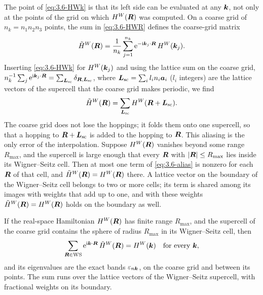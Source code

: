 The point of \cref{eq:3.6-HWk} is that its left side can be evaluated at any $\bm{k}$, not only at the points of the grid on which $H^W(\bm{R})$ was computed. On a coarse grid of $n_k = n_1n_2n_3$ points, the sum in \cref{eq:3.6-HWR} defines the coarse-grid matrix
\begin{equation*}
  \tilde H^W(\bm{R}) = \frac{1}{n_k}\sum_{j=1}^{n_k}\mathrm{e}^{-\mathrm{i}\bm{k}_j\cdot\bm{R}}\,H^W(\bm{k}_j) .
\end{equation*}
Inserting \cref{eq:3.6-HWk} for $H^W(\bm{k}_j)$ and using the lattice sum on the coarse grid, $n_k^{-1}\sum_j\mathrm{e}^{\mathrm{i}\bm{k}_j\cdot\bm{R}} = \sum_{\bm{L}_{\mathrm{sc}}}\delta_{\bm{R},\bm{L}_{\mathrm{sc}}}$, where $\bm{L}_{\mathrm{sc}} = \sum_i l_i n_i\bm{a}_i$ ($l_i$ integers) are the lattice vectors of the supercell that the coarse grid makes periodic, we find
\begin{equation}
  \tilde H^W(\bm{R}) = \sum_{\bm{L}_{\mathrm{sc}}}H^W(\bm{R} + \bm{L}_{\mathrm{sc}}) .
  \label{eq:3.6-alias}
\end{equation}
The coarse grid does not lose the hoppings; it folds them onto one supercell, so that a hopping to $\bm{R} + \bm{L}_{\mathrm{sc}}$ is added to the hopping to $\bm{R}$. This aliasing is the only error of the interpolation. Suppose $H^W(\bm{R})$ vanishes beyond some range $R_{\mathrm{max}}$, and the supercell is large enough that every $\bm{R}$ with $|\bm{R}| \le R_{\mathrm{max}}$ lies inside its Wigner--Seitz cell. Then at most one term of \cref{eq:3.6-alias} is nonzero for each $\bm{R}$ of that cell, and $\tilde H^W(\bm{R}) = H^W(\bm{R})$ there. A lattice vector on the boundary of the Wigner--Seitz cell belongs to two or more cells; its term is shared among its images with weights that add up to one, and with these weights $\tilde H^W(\bm{R}) = H^W(\bm{R})$ holds on the boundary as well.
\begin{keyresult}
If the real-space Hamiltonian $H^W(\bm{R})$ has finite range $R_{\mathrm{max}}$, and the supercell of the coarse grid contains the sphere of radius $R_{\mathrm{max}}$ in its Wigner--Seitz cell, then
\begin{equation}
  \sum_{\bm{R}\in\mathrm{WS}}\mathrm{e}^{\mathrm{i}\bm{k}\cdot\bm{R}}\,\tilde H^W(\bm{R}) = H^W(\bm{k}) \quad\text{for every }\bm{k},
  \label{eq:3.6-exact}
\end{equation}
and its eigenvalues are the exact bands $\varepsilon_{n\bm{k}}$, on the coarse grid and between its points. The sum runs over the lattice vectors of the Wigner--Seitz supercell, with fractional weights on its boundary.
\end{keyresult}
